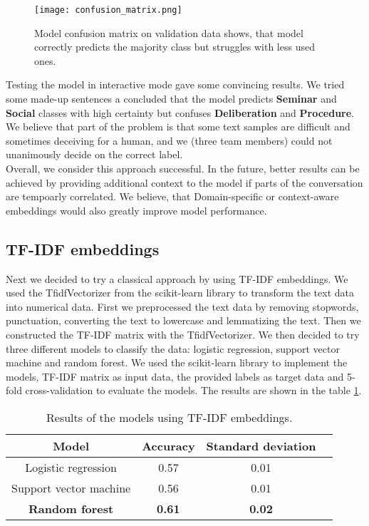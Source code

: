 \documentclass[fleqn,moreauthors,10pt]{ds_report}
\begin{document}
\begin{figure}[!htb]
    \centering
    \texttt{[image: confusion\_matrix.png]}
    \caption{Model confusion matrix on validation data shows, that model correctly predicts the majority class but struggles with less used ones.}
    \label{fig:conf_matrix_model}
\end{figure}

Testing the model in interactive mode gave some convincing results. We tried some made-up sentences a concluded that the model predicts \textbf{Seminar} and \textbf{Social} classes with high certainty but confuses \textbf{Deliberation} and \textbf{Procedure}. \\
We believe that part of the problem is that some text samples are difficult and sometimes deceiving for a human, and we (three team members) could not unanimously decide on the correct label. \\

Overall, we consider this approach successful. In the future, better results can be achieved by providing additional context to the model if parts of the conversation are tempoarly correlated. We believe, that Domain-specific or context-aware embeddings would also greatly improve model performance. 

\subsection{TF-IDF embeddings}
Next we decided to try a classical approach by using TF-IDF embeddings. We used the TfidfVectorizer from the scikit-learn library to transform the text data into numerical data. 
First we preprocessed the text data by removing stopwords, punctuation, converting the text to lowercase and lemmatizing the text. Then we constructed the TF-IDF matrix with the TfidfVectorizer.
We then decided to try three different models to classify the data: logistic regression, support vector machine and random forest. We used the scikit-learn library to implement the models, TF-IDF matrix as input data, the provided labels as target data and 5-fold cross-validation to evaluate the models.
The results are shown in the table \ref{tab:tfidf_results}.

\begin{table}[h]
    \centering
    \begin{tabular}{|c|c|c|c|}
    \hline
    \textbf{Model} & \textbf{Accuracy} & \textbf{Standard deviation} \\ \hline
    Logistic regression & 0.57 & 0.01 \\ \hline
    Support vector machine & 0.56 & 0.01 \\ \hline
    \textbf{Random forest} & \textbf{0.61} & \textbf{ 0.02} \\ \hline
    \end{tabular}

    \caption{Results of the models using TF-IDF embeddings.}
    \label{tab:tfidf_results}
\end{table}
\end{document}

